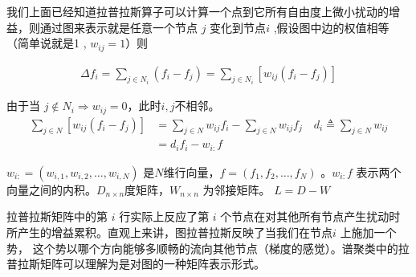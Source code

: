      我们上面已经知道拉普拉斯算子可以计算一个点到它所有自由度上微小扰动的增益，则通过图来表示就是任意一个节点 $ j $ 变化到节点$ i $ ,假设图中边的权值相等（简单说就是1 , $ w_{ij} = 1 $）则

     \begin{align*}
         \Delta f_{i} = \sum_{j \in N_{i}} (f_i - f_j) = \sum_{j \in N_{i}} \left [ w_{ij} (f_i - f_j) \right ] 
     \end{align*}

     由于当  $ j \notin  N_{i} \Longrightarrow w_{ij} = 0 $，此时$ i,j $不相邻。
     \begin{align*}
         \sum_{j \in N }  \left [ w_{ij} (f_i - f_j) \right ] &  = \sum_{j \in N } w_{ij}f_i - \sum_{j \in N } w_{ij} f_j \quad d_i \triangleq  \sum_{j \in N } w_{ij}   \\
           & = d_{i} f_{i} -w_{i:}f
    \end{align*}

    $ w_{i:} = (w_{i,1},w_{i,2},\dots,w_{i,N} )$  是$ N $维行向量，$ f = (f_{1},f_{2},\dots,f_{N} )$ 。$ w_{i:}f $ 表示两个向量之间的内积。$ D_{n \times n} $度矩阵，$ W_{n \times n} $ 为邻接矩阵。    $L = D-W $

    \begin{myRemark}
        拉普拉斯矩阵中的第 $ i $ 行实际上反应了第 $ i $ 个节点在对其他所有节点产生扰动时所产生的增益累积。直观上来讲，图拉普拉斯反映了当我们在节点$ i $ 上施加一个势，
        这个势以哪个方向能够多顺畅的流向其他节点（梯度的感觉）。谱聚类中的拉普拉斯矩阵可以理解为是对图的一种矩阵表示形式。
    \end{myRemark}

